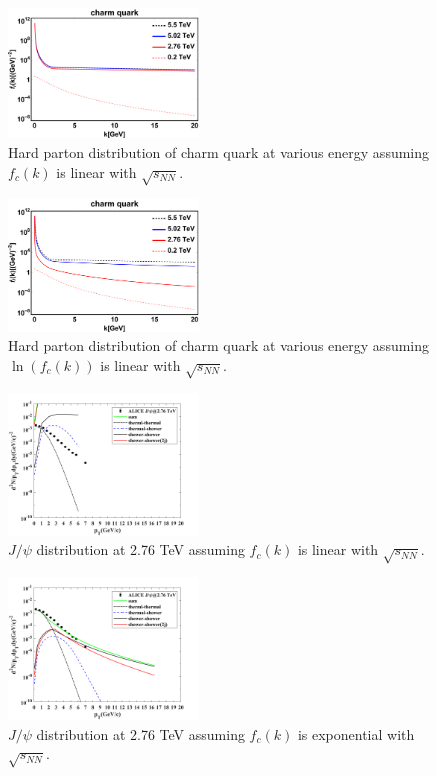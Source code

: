 \documentclass[twocolumn,aps,superscriptaddress,nofootinbib,floatfix]{revtex4}
\begin{document}
\begin{figure}[H]
	\includegraphics[width=0.45\textwidth]{fikc.png}
	\caption{Hard parton distribution of charm quark at various energy assuming $f_c(k)$ is linear with $\sqrt{s_{NN}}$.}
	\label{fig9}
\end{figure}

\begin{figure}[H]
	\includegraphics[width=0.45\textwidth]{fikc_log.png}
	\caption{Hard parton distribution of charm quark at various energy assuming $\ln(f_c(k))$ is linear with $\sqrt{s_{NN}}$.}
	\label{fig10}
\end{figure}

\begin{figure}[H]
	\includegraphics[width=0.45\textwidth]{jpsi_f_vs_s.png}
	\caption{$J/\psi$ distribution at 2.76 TeV assuming $f_c(k)$ is linear with $\sqrt{s_{NN}}$.}
	\label{fig12}
\end{figure}

\begin{figure}[H]
	\includegraphics[width=0.45\textwidth]{jpsi_lnf_vs_s.png}
	\caption{$J/\psi$ distribution at 2.76 TeV assuming $f_c(k)$ is exponential with $\sqrt{s_{NN}}$.}
	\label{fig13}
\end{figure}
\end{document}
